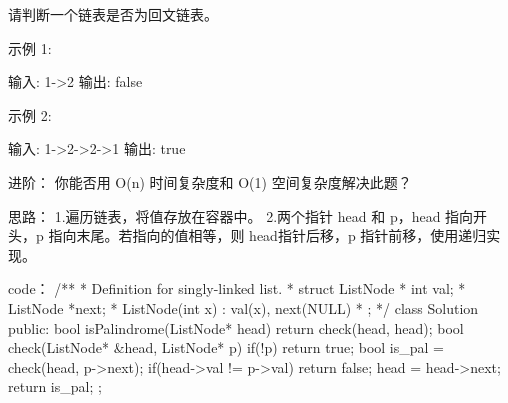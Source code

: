 请判断一个链表是否为回文链表。

示例 1:

输入: 1->2
输出: false

示例 2:

输入: 1->2->2->1
输出: true

进阶：
你能否用 O(n) 时间复杂度和 O(1) 空间复杂度解决此题？



























思路：
1.遍历链表，将值存放在容器中。
2.两个指针 head 和 p，head 指向开头，p 指向末尾。若指向的值相等，则 head指针后移，p 指针前移，使用递归实现。

































code：
/**
 * Definition for singly-linked list.
 * struct ListNode {
 *     int val;
 *     ListNode *next;
 *     ListNode(int x) : val(x), next(NULL) {}
 * };
 */
class Solution {
public:
    bool isPalindrome(ListNode* head) {
        return check(head, head);
    }
    bool check(ListNode* &head, ListNode* p)
    {
        if(!p) return true;
        bool is_pal = check(head, p->next);
        if(head->val != p->val)
            return false;
        head = head->next;
        return is_pal;
    }
};